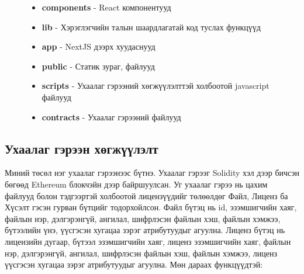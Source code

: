\begin{figure}[htbp]
\begin{minipage}[h!t]{0.5\textwidth}
      \raggedright
      \begin{itemize}
         \item \textbf{components} - React компонентууд
         \item \textbf{lib} - Хэрэглэгчийн талын шаардлагатай код туслах функцүүд
         \item \textbf{app} - NextJS дээрх хуудаснууд
         \item \textbf{public} - Статик зураг, файлууд
         \item \textbf{scripts} - Ухаалаг гэрээний хөгжүүлэлттэй холбоотой  javascript файлууд
         \item \textbf{contracts} - Ухаалаг гэрээний файлууд
      \end{itemize}
  \end{minipage}
\end{figure}

\newpage
\subsection{Ухаалаг гэрээн хөгжүүлэлт}
Миний төсөл нэг ухаалаг гэрээнээс бүтнэ. Ухаалаг гэрээг Solidity хэл дээр бичсэн бөгөөд Ethereum  блокчэйн дээр байршуулсан. Уг ухаалаг гэрээ нь цахим файлууд болон тэдгээртэй холбоотой лицензүүдийг төлөөлдөг Файл, Лиценз ба Хүсэлт гэсэн гурван бүтцийг тодорхойлсон. Файл бүтэц  нь id, эзэмшигчийн хаяг, файлын нэр, дэлгэрэнгүй, ангилал, шифрлэсэн файлын хэш, файлын хэмжээ, бүтээлийн үнэ, үүсгэсэн хугацаа зэрэг атрибутуудыг агуулна. Лиценз бүтэц нь лицензийн дугаар, бүтээл эзэмшигчийн хаяг, лиценз эзэмшигчийн хаяг, файлын нэр, дэлгэрэнгүй, ангилал, шифрлэсэн файлын хэш, файлын хэмжээ, лиценз үүсгэсэн хугацаа  зэрэг атрибутуудыг агуулна.
Мөн дараах функцүүдтэй:

